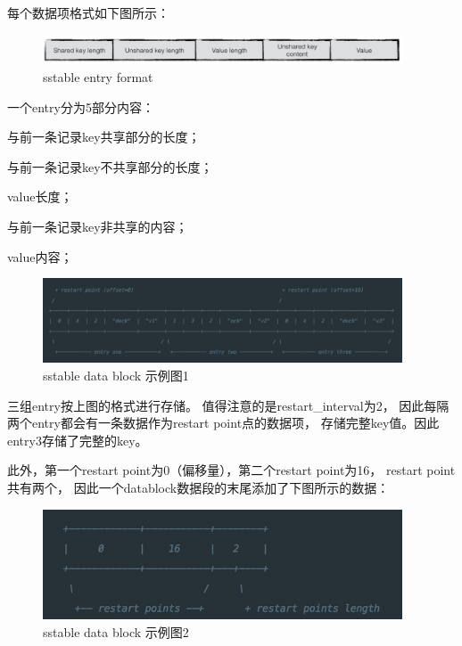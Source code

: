 \begin{enumerate}
\begin{enumerate}
					
					每个数据项格式如下图所示：
	
					\begin{figure}[H]
						\centering
						\includegraphics[width=0.95\textwidth]{images/entry_format.jpeg}
						\caption{sstable entry format}
						\label{sstable_entry_format}
					\end{figure}
	
					一个entry分为5部分内容：
	
	与前一条记录key共享部分的长度；
	
	与前一条记录key不共享部分的长度；
	
	value长度；
	
	与前一条记录key非共享的内容；
	
	value内容；
	
	\begin{figure}[H]
		\centering
		\includegraphics[width=0.95\textwidth]{images/datablock_example_1.jpeg}
		\caption{sstable data block 示例图1}
		\label{sstable_datablock_example_1}
	\end{figure}
	
	
	三组entry按上图的格式进行存储。
	值得注意的是restart\_interval为2，
	因此每隔两个entry都会有一条数据作为restart point点的数据项，
	存储完整key值。因此entry3存储了完整的key。
	
	此外，第一个restart point为0（偏移量），第二个restart point为16，
	restart point共有两个，
	因此一个datablock数据段的末尾添加了下图所示的数据：
	
	\begin{figure}[H]
		\centering
		\includegraphics[width=0.95\textwidth]{images/datablock_example_2.jpeg}
		\caption{sstable data block 示例图2}
		\label{sstable_datablock_example_2}
	\end{figure}
	

\end{enumerate}
\end{enumerate}
